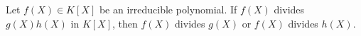 Let $f(X) \in K[X]$ be an irreducible polynomial. If $f(X)$ divides $g(X)h(X)$ in $K[X]$, then $f(X)$ divides $g(X)$ or $f(X)$ divides $h(X)$.
